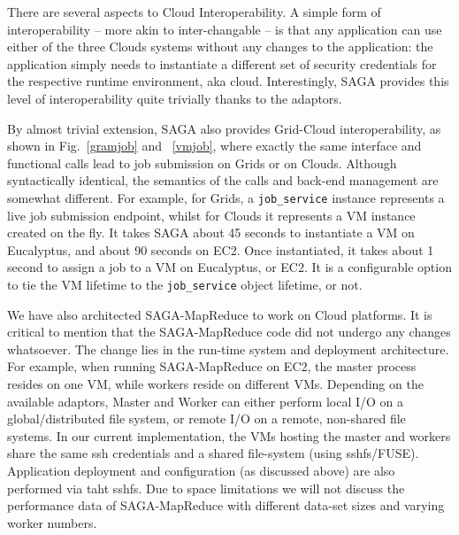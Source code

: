 \documentclass[conference,final]{IEEEtran}
\newcommand{\sagamapreduce }{SAGA-MapReduce }
\begin{document}
There are several aspects to Cloud Interoperability. A simple form of
interoperability -- more akin to inter-changable -- is that any
application can use either of the three Clouds systems without any
changes to the application: the application simply needs to
instantiate a different set of security credentials for the respective
runtime environment, aka cloud.  Interestingly, SAGA provides this level of
interoperability quite trivially thanks to the adaptors.

By almost
trivial extension, SAGA also provides Grid-Cloud interoperability, as shown
in Fig.~\ref{gramjob} and ~\ref{vmjob}, where exactly the same
interface and functional calls lead to job submission on Grids or on
Clouds. Although syntactically identical, the semantics of the calls
and back-end management are somewhat different.  For example, for
Grids, a \texttt{job\_service} instance represents a live job
submission endpoint, whilst for Clouds it represents a VM
instance created on the fly.  It takes SAGA about 45 seconds to
instantiate a VM on Eucalyptus, and about 90 seconds on EC2. Once
instantiated, it takes about 1 second to assign a job to a VM on
Eucalyptus, or EC2.  It is a configurable option to tie the VM
lifetime to the \texttt{job\_service} object lifetime, or not.

We have also architected \sagamapreduce to work on Cloud platforms.  It
is critical to mention that the \sagamapreduce code did not undergo
any changes whatsoever. The change lies in the run-time system and
deployment architecture. For example, when running \sagamapreduce on
EC2, the master process resides on one VM, while workers reside on
different VMs.
Depending on the available adaptors, Master and Worker can either 
perform local I/O on a global/distributed file system, or remote 
I/O on a remote, non-shared file systems.  In our current implementation, 
the VMs hosting the master and workers share the same ssh
credentials and a shared file-system (using sshfs/FUSE).  Application
deployment and configuration (as discussed above) are also performed
via taht sshfs.
Due to space limitations we will not
discuss the performance data of \sagamapreduce with different data-set
sizes and varying worker numbers.


\end{document}
